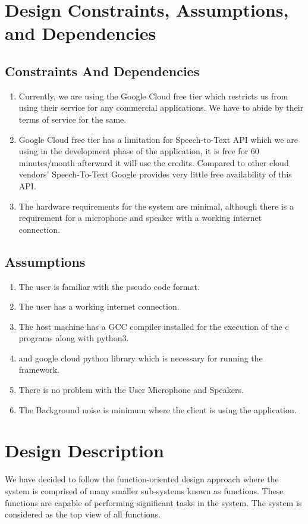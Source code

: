 \documentclass[12pt]{article}
\begin{document}
\section{Design Constraints, Assumptions, and Dependencies}

\subsection{Constraints And Dependencies}
\begin{enumerate}
    \item Currently, we are using the Google Cloud free tier which restricts us from using their service for any commercial applications. We have to abide by their terms of service for the same.
    \item Google Cloud free tier has a limitation for Speech-to-Text API which we are using in the development phase of the application, it is free for 60 minutes/month afterward it will use the credits. Compared to other cloud vendors' Speech-To-Text Google provides very little free availability of this API.
    \item The hardware requirements for the system are minimal, although there is a requirement for a microphone and speaker with a working internet connection.
\end{enumerate}

\subsection{Assumptions}
\begin{enumerate}
    \item The user is familiar with the pseudo code format.
    \item The user has a working internet connection.
    \item The host machine has a GCC compiler installed for the execution of the c programs along with python3.
    \item and google cloud python library which is necessary for running the framework.
    \item There is no problem with the User Microphone and Speakers.
    \item The Background noise is minimum where the client is using the application.
\end{enumerate}

\setlength{\parindent}{0pt}
\newcommand{\forceindent}{\leavevmode{\parindent=1em\indent}}

\section{Design Description}
We have decided to follow the function-oriented design approach where the system is comprised of many smaller sub-systems known as functions. These functions are capable of performing significant tasks in the system. The system is considered as the top view of all functions.\\
\end{document}
